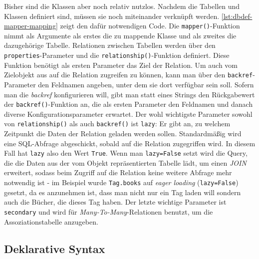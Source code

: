 

Bisher sind die Klassen aber noch relativ nutzlos. Nachdem die Tabellen und
Klassen definiert sind, müssen sie noch miteinander verknüpft werden.
\autoref{lst:dbdef-mapper-mapping} zeigt den dafür notwendigen Code. Die
\texttt{mapper()}-Funktion nimmt als Argumente als erstes die zu mappende Klasse
und als zweites die dazugehörige Tabelle. Relationen zwischen Tabellen werden
über den \texttt{properties}-Parameter und die \texttt{relationship()}-Funktion
definiert. Diese Funktion benötigt als ersten Parameter das Ziel der Relation.
Um auch vom Zielobjekt aus auf die Relation zugreifen zu können, kann man über
den \texttt{backref}-Parameter den Feldnamen angeben, unter dem sie dort
verfügbar sein soll. Sofern man die \emph{backref} konfigurieren will, gibt
man statt eines Strings den Rückgabewert der \texttt{backref()}-Funktion an, die
als ersten Parameter den Feldnamen und danach diverse Konfigurationsparameter
erwartet. Der wohl wichtigste Parameter sowohl von \texttt{relationship()} als
auch \texttt{backref()} ist \texttt{lazy}: Er gibt an, zu welchem Zeitpunkt die
Daten der Relation geladen werden sollen. Standardmäßig wird eine SQL-Abfrage
abgeschickt, sobald auf die Relation zugegriffen wird. In diesem Fall hat
\texttt{lazy} also den Wert \texttt{True}. Wenn man \texttt{lazy=False} setzt
wird die Query, die die Daten aus der vom Objekt repräsentierten Tabelle lädt,
um einen \emph{JOIN} erweitert, sodass beim Zugriff auf die Relation keine weitere
Abfrage mehr notwendig ist - im Beispiel
wurde \texttt{Tag.books} auf \emph{eager loading} (\texttt{lazy=False}) gesetzt,
da es anzunehmen ist, dass man nicht nur ein Tag laden will sondern auch die
Bücher, die dieses Tag haben. Der letzte wichtige Parameter ist
\texttt{secondary} und wird für \emph{Many-To-Many}-Relationen benutzt, um die
Assoziationstabelle anzugeben.




\subsection{Deklarative Syntax}

